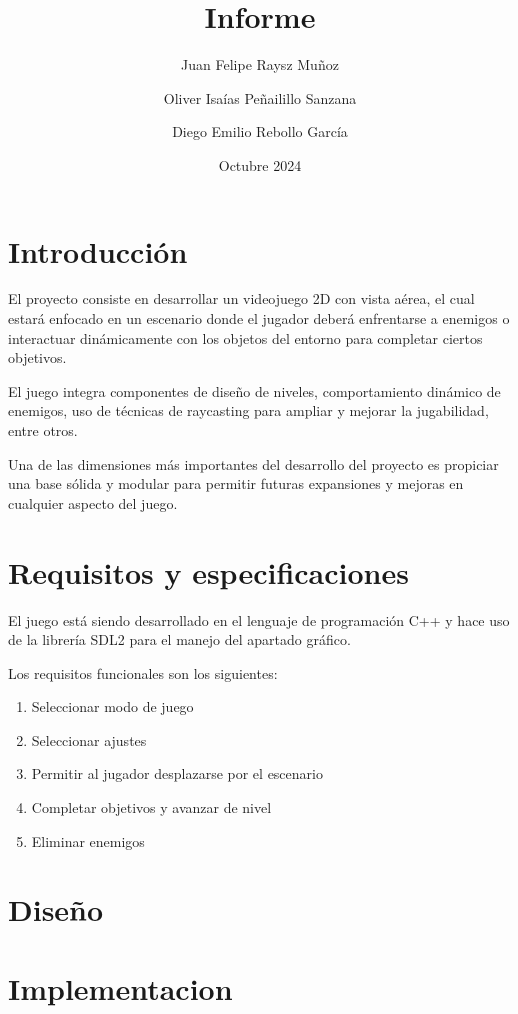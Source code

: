 \documentclass{article}
\date{Octubre 2024}
\title{Informe}
\author{
	Juan Felipe Raysz Muñoz
	\and
	Oliver Isaías Peñailillo Sanzana
	\and
	Diego Emilio Rebollo García
}
\begin{document}
	\maketitle
	
	\section{Introducción}
		El proyecto consiste en desarrollar un videojuego 2D con vista aérea, el cual estará enfocado en un escenario donde el jugador deberá enfrentarse a enemigos o interactuar dinámicamente con los objetos del entorno para completar ciertos objetivos.
		
		El juego integra componentes de diseño de niveles, comportamiento dinámico de enemigos, uso de técnicas de raycasting para ampliar y mejorar la jugabilidad, entre otros.
		
		Una de las dimensiones más importantes del desarrollo del proyecto es propiciar una base sólida y modular para permitir futuras expansiones y mejoras en cualquier aspecto del juego.
	
	\section{Requisitos y especificaciones}
		El juego está siendo desarrollado en el lenguaje de programación C++ y hace uso de la librería SDL2 para el manejo del apartado gráfico.
		
		Los requisitos funcionales son los siguientes:
		
		\begin{enumerate}
			\item Seleccionar modo de juego
			\item Seleccionar ajustes
			\item Permitir al jugador desplazarse por el escenario
			\item Completar objetivos y avanzar de nivel
			\item Eliminar enemigos
		\end{enumerate}
	
	\section{Diseño}
	
	\section{Implementacion}
\end{document}
